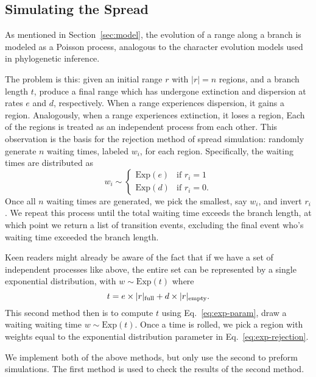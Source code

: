 \documentclass{article}
\begin{document}
\subsection{Simulating the Spread}

As mentioned in Section~\ref{sec:model}, the evolution of a range along a
branch is modeled as a Poisson process, analogous to the character evolution
models used in phylogenetic inference.

The problem is this: given an initial range \( r \) with \( |r| = n \) regions,
and a branch length \( t \), produce a final range which has undergone
extinction and dispersion at rates \( e \) and \( d \), respectively.
When a range experiences dispersion, it gains a region.
Analogously, when a range experiences extinction, it loses a region, Each of
the regions is treated as an independent process from each other.
This observation is the basis for the rejection method of spread simulation:
randomly generate \( n \) waiting times, labeled \( w_i \), for each region.
Specifically, the waiting times are distributed as
\begin{equation}
	\label{eq:exp-rejection} w_i \sim
	\begin{cases}
		\text{Exp}(e) & \text{if } r_i
		= 1                            \\ \text{Exp}(d) & \text{if } r_i = 0.
	\end{cases}
\end{equation}
Once all $n$ waiting times are generated, we pick the smallest, say $w_i$, and
invert $r_i$.
We repeat this process until the total waiting time exceeds the branch length,
at which point we return a list of transition events, excluding the final event
who's waiting time exceeded the branch length.

Keen readers might already be aware of the fact that if we have a set of
independent processes like above, the entire set can be represented by a single
exponential distribution, with \(w \sim \text{Exp}(t) \) where
\begin{equation}
	\label{eq:exp-param} t = e \times |r|_\text{full} + d \times |r|_\text{empty}.
\end{equation}
This second method then is to compute \( t \) using Eq.~\ref{eq:exp-param},
draw a waiting waiting time \( w \sim \text{Exp}(t) \).
Once a time is rolled, we pick a region with weights equal to the exponential
distribution parameter in Eq.~\ref{eq:exp-rejection}.

We implement both of the above methods, but only use the second to preform
simulations.
The first method is used to check the results of the second method.
\end{document}
